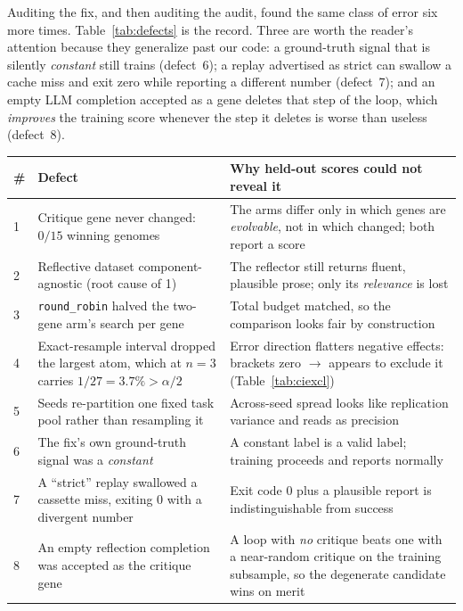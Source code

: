 \documentclass[11pt]{article}
\begin{document}
Auditing the fix, and then auditing the audit, found the same class of error six more times.
Table~\ref{tab:defects} is the record. Three are worth the reader's attention because they
generalize past our code: a ground-truth signal that is silently \emph{constant} still trains
(defect~6); a replay advertised as strict can swallow a cache miss and exit zero while
reporting a different number (defect~7); and an empty LLM completion accepted as a gene
deletes that step of the loop, which \emph{improves} the training score whenever the step it
deletes is worse than useless (defect~8).

\begin{table}[h]
\centering
\small
\begin{tabular}{p{}p{}p{}}
\toprule
\# & Defect & Why held-out scores could not reveal it \\
\midrule
1 & Critique gene never changed: $0/15$ winning genomes & The arms differ only in which genes
  are \emph{evolvable}, not in which changed; both report a score \\
2 & Reflective dataset component-agnostic (root cause of 1) & The reflector still returns
  fluent, plausible prose; only its \emph{relevance} is lost \\
3 & \texttt{round\_robin} halved the two-gene arm's search per gene & Total budget matched, so
  the comparison looks fair by construction \\
4 & Exact-resample interval dropped the largest atom, which at $n{=}3$ carries
  $1/27 = 3.7\% > \alpha/2$ & Error direction flatters negative effects: brackets zero
  $\to$ appears to exclude it (Table~\ref{tab:ciexcl}) \\
5 & Seeds re-partition one fixed task pool rather than resampling it & Across-seed spread
  looks like replication variance and reads as precision \\
6 & The fix's own ground-truth signal was a \emph{constant} & A constant label is a valid
  label; training proceeds and reports normally \\
7 & A ``strict'' replay swallowed a cassette miss, exiting $0$ with a divergent number &
  Exit code $0$ plus a plausible report is indistinguishable from success \\
8 & An empty reflection completion was accepted as the critique gene & A loop with \emph{no}
  critique beats one with a near-random critique on the training subsample, so the degenerate
  candidate wins on merit \\

\end{tabular}
\end{table}
\end{document}
